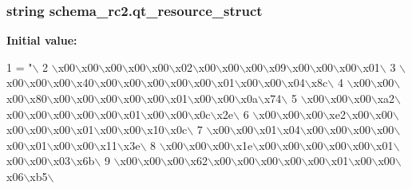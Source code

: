 \subsubsection[{qt\+\_\+resource\+\_\+struct}]{\setlength{\rightskip}{0pt plus 5cm}string schema\+\_\+rc2.\+qt\+\_\+resource\+\_\+struct}\label{namespaceschema__rc2_a3b512075437458deda11c9ffc1bd0fab}
{\bfseries Initial value\+:}
\begin{DoxyCode}
1 = \textcolor{stringliteral}{"\(\backslash\)}
2 \textcolor{stringliteral}{\(\backslash\)x00\(\backslash\)x00\(\backslash\)x00\(\backslash\)x00\(\backslash\)x00\(\backslash\)x02\(\backslash\)x00\(\backslash\)x00\(\backslash\)x00\(\backslash\)x09\(\backslash\)x00\(\backslash\)x00\(\backslash\)x00\(\backslash\)x01\(\backslash\)}
3 \textcolor{stringliteral}{\(\backslash\)x00\(\backslash\)x00\(\backslash\)x00\(\backslash\)x40\(\backslash\)x00\(\backslash\)x00\(\backslash\)x00\(\backslash\)x00\(\backslash\)x00\(\backslash\)x01\(\backslash\)x00\(\backslash\)x00\(\backslash\)x04\(\backslash\)x8c\(\backslash\)}
4 \textcolor{stringliteral}{\(\backslash\)x00\(\backslash\)x00\(\backslash\)x00\(\backslash\)x80\(\backslash\)x00\(\backslash\)x00\(\backslash\)x00\(\backslash\)x00\(\backslash\)x00\(\backslash\)x01\(\backslash\)x00\(\backslash\)x00\(\backslash\)x0a\(\backslash\)x74\(\backslash\)}
5 \textcolor{stringliteral}{\(\backslash\)x00\(\backslash\)x00\(\backslash\)x00\(\backslash\)xa2\(\backslash\)x00\(\backslash\)x00\(\backslash\)x00\(\backslash\)x00\(\backslash\)x00\(\backslash\)x01\(\backslash\)x00\(\backslash\)x00\(\backslash\)x0c\(\backslash\)x2e\(\backslash\)}
6 \textcolor{stringliteral}{\(\backslash\)x00\(\backslash\)x00\(\backslash\)x00\(\backslash\)xe2\(\backslash\)x00\(\backslash\)x00\(\backslash\)x00\(\backslash\)x00\(\backslash\)x00\(\backslash\)x01\(\backslash\)x00\(\backslash\)x00\(\backslash\)x10\(\backslash\)x0c\(\backslash\)}
7 \textcolor{stringliteral}{\(\backslash\)x00\(\backslash\)x00\(\backslash\)x01\(\backslash\)x04\(\backslash\)x00\(\backslash\)x00\(\backslash\)x00\(\backslash\)x00\(\backslash\)x00\(\backslash\)x01\(\backslash\)x00\(\backslash\)x00\(\backslash\)x11\(\backslash\)x3e\(\backslash\)}
8 \textcolor{stringliteral}{\(\backslash\)x00\(\backslash\)x00\(\backslash\)x00\(\backslash\)x1e\(\backslash\)x00\(\backslash\)x00\(\backslash\)x00\(\backslash\)x00\(\backslash\)x00\(\backslash\)x01\(\backslash\)x00\(\backslash\)x00\(\backslash\)x03\(\backslash\)x6b\(\backslash\)}
9 \textcolor{stringliteral}{\(\backslash\)x00\(\backslash\)x00\(\backslash\)x00\(\backslash\)x62\(\backslash\)x00\(\backslash\)x00\(\backslash\)x00\(\backslash\)x00\(\backslash\)x00\(\backslash\)x01\(\backslash\)x00\(\backslash\)x00\(\backslash\)x06\(\backslash\)xb5\(\backslash\)}

\end{DoxyCode}

